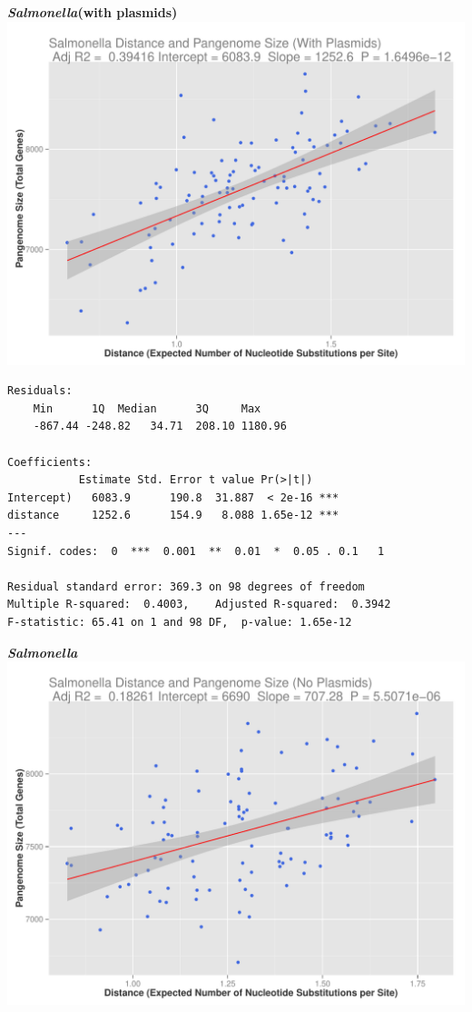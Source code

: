 \documentclass[12pt]{article}
\newcommand{\salm}{\textit{Salmonella}\xspace}
\begin{document}
{\large \textbf{\salm (with plasmids)}\\}
\includegraphics[width=\textwidth]{salmwithplasmidplots.pdf}

\begin{lstlisting}
Residuals:
    Min      1Q  Median      3Q     Max 
    -867.44 -248.82   34.71  208.10 1180.96 

Coefficients:
           Estimate Std. Error t value Pr(>|t|)    
Intercept)   6083.9      190.8  31.887  < 2e-16 ***
distance     1252.6      154.9   8.088 1.65e-12 ***
---
Signif. codes:  0  ***  0.001  **  0.01  *  0.05 . 0.1   1

Residual standard error: 369.3 on 98 degrees of freedom
Multiple R-squared:  0.4003,    Adjusted R-squared:  0.3942 
F-statistic: 65.41 on 1 and 98 DF,  p-value: 1.65e-12
\end{lstlisting}

\newpage

{\large \textbf{\salm}\\}
\includegraphics[width=\textwidth]{salmwoplasmidplot.pdf}
\end{document}

